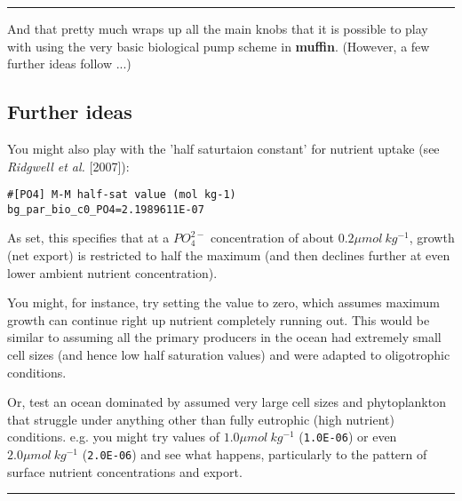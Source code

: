 \vspace{1mm}
\noindent\rule{4cm}{0.5pt}
\vspace{2mm}

\noindent And that pretty much wraps up all the main knobs that it is possible to play with using the very basic biological pump scheme in \textbf{muffin}. (However, a few further ideas follow ...)

\newpage

\subsection{Further ideas}

\noindent You might also play with the 'half saturtaion constant' for nutrient uptake (see \textit{Ridgwell et al.} [2007]):
\vspace{-2mm}\small\begin{verbatim}
#[PO4] M-M half-sat value (mol kg-1)
bg_par_bio_c0_PO4=2.1989611E-07
\end{verbatim}\normalsize\vspace{-1mm}
As set, this specifies that at a \(PO^{2-}_{4}\) concentration of about \(0.2 \mu mol \:kg^{-1} \), growth (net export) is restricted to half the maximum (and then declines further at even lower ambient nutrient concentration).

\vspace{1mm}
You might, for instance, try setting the value to zero, which assumes maximum growth can continue right up nutrient completely running out. This would be similar to assuming all the primary producers in the ocean had extremely small cell sizes (and hence low half saturation values) and were adapted to oligotrophic conditions.

Or, test an ocean dominated by assumed very large cell sizes and phytoplankton that struggle under anything other than fully eutrophic (high nutrient) conditions. e.g. you might try values of \(1.0 \mu mol \:kg^{-1}\) (\texttt{1.0E-06}) or even \(2.0 \mu mol \:kg^{-1}\) (\texttt{2.0E-06}) and see what happens, particularly to the pattern of surface nutrient concentrations and export.

\vspace{1mm}
\noindent\rule{4cm}{0.5pt}
\vspace{2mm}


